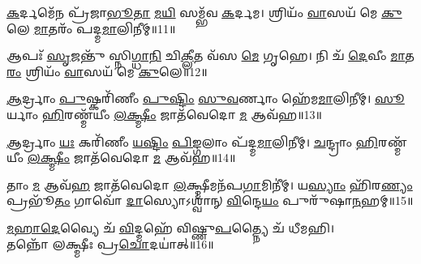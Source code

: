 \-\ul{𑌕}\-𑌰𑍍𑌦𑌮𑍇᳴𑌨 𑌪𑍍𑌰᳴𑌜𑌾\-\ul{𑌭𑍂}\-\-\ul{𑌤𑌾} \ul{𑌮}\-\-\ul{𑌯𑌿} 𑌸𑌮𑍍𑌭᳴𑌵 \ul{𑌕}\-𑌰𑍍𑌦𑌮।
𑌶𑍍𑌰𑌿𑌯𑌂᳴ \ul{𑌵𑌾}\-𑌸𑌯᳴ 𑌮𑍇 \ul{𑌕𑍁}\-𑌲𑍇 \ul{𑌮𑌾}\-𑌤𑌰𑌂᳴ 𑌪𑌦𑍍𑌮\-\ul{𑌮𑌾}\-𑌲𑌿𑌨𑍀𑌮𑍍॥11॥

𑌆𑌪𑌃᳴ \ul{𑌸𑍃}\-𑌜𑌨𑍍𑌤𑍁᳴ 𑌸𑍍𑌨𑌿\-\ul{𑌗𑍍𑌧𑌾}\-\-\ul{𑌨𑌿} 𑌚𑌿\-\ul{𑌕𑍍𑌲𑍀}\-𑌤 𑌵᳴𑌸 \ul{𑌮𑍇} 𑌗𑍃𑌹𑍇।
𑌨𑌿 𑌚᳴ \ul{𑌦𑍇}\-𑌵𑍀𑌂 \ul{𑌮𑌾}\-𑌤\-\ul{𑌰𑌂} 𑌶𑍍𑌰𑌿𑌯𑌂᳴ \ul{𑌵𑌾}\-𑌸𑌯᳴ 𑌮𑍇 \ul{𑌕𑍁}\-𑌲𑍇॥12॥

\-\ul{𑌆}\-𑌰𑍍𑌦𑍍𑌰𑌾𑌂 \ul{𑌪𑍁}\-𑌷𑍍𑌕𑌰𑌿᳴𑌣𑍀𑌂 \ul{𑌪𑍁}\-\-\ul{𑌷𑍍𑌟𑌿𑌂} \ul{𑌸𑍁}\-\-\ul{𑌵}\-𑌰𑍍𑌣𑌾𑌂 𑌹𑍇᳴𑌮\-\ul{𑌮𑌾}\-𑌲𑌿𑌨𑍀𑌮𑍍।
\-\ul{𑌸𑍂}\-𑌰𑍍𑌯𑌾𑌂 \ul{𑌹𑌿}\-𑌰𑌣𑍍𑌮᳴𑌯𑍀𑌂 \ul{𑌲}\-\-\ul{𑌕𑍍𑌷𑍍𑌮𑍀𑌂} 𑌜𑌾𑌤᳴𑌵𑍇𑌦𑍋 \ul{𑌮} 𑌆𑌵᳴𑌹॥13॥

\-\ul{𑌆}\-𑌰𑍍𑌦𑍍𑌰𑌾𑌂 \ul{𑌯𑌃} 𑌕𑌰𑌿᳴𑌣𑍀𑌂 \ul{𑌯}\-\-\ul{𑌷𑍍𑌟𑌿𑌂} \ul{𑌪𑌿}\-\-\ul{𑌙𑍍𑌗}\-𑌲𑌾𑌂 𑌪᳴𑌦𑍍𑌮\-\ul{𑌮𑌾}\-𑌲𑌿𑌨𑍀𑌮𑍍।
\-\ul{𑌚}\-𑌨𑍍𑌦𑍍𑌰𑌾𑌂 \ul{𑌹𑌿}\-𑌰𑌣𑍍𑌮᳴𑌯𑍀𑌂 \ul{𑌲}\-\-\ul{𑌕𑍍𑌷𑍍𑌮𑍀𑌂} 𑌜𑌾𑌤᳴𑌵𑍇𑌦𑍋 \ul{𑌮} 𑌆𑌵᳴𑌹॥14॥

𑌤𑌾𑌂 \ul{𑌮} 𑌆𑌵᳴\-\ul{𑌹} 𑌜𑌾𑌤᳴𑌵𑍇𑌦𑍋 \ul{𑌲}\-𑌕𑍍𑌷𑍍𑌮𑍀𑌮𑌨᳴𑌪\-\ul{𑌗𑌾}\-𑌮𑌿𑌨𑍀॑𑌮𑍍।
𑌯\-\ul{𑌸𑍍𑌯𑌾𑌂} 𑌹𑌿᳴𑌰\-\ul{𑌣𑍍𑌯𑌂} 𑌪𑍍𑌰𑌭𑍂᳴\-\ul{𑌤𑌂} 𑌗𑌾𑌵𑍋᳴ \ul{𑌦𑌾}\-𑌸𑍍𑌯𑍋𑌽𑌶𑍍𑌵𑌾॑𑌨𑍍 \ul{𑌵𑌿}\-𑌨𑍍𑌦𑍇\-\ul{𑌯𑌂} 𑌪𑍁𑌰𑍁᳴𑌷𑌾\-\ul{𑌨}\-𑌹𑌮𑍍॥15॥

\begin{center}
{\-\ul{𑌮}\-\-\ul{𑌹𑌾}\-\-\ul{𑌦𑍇}\-𑌵𑍍𑌯𑍈 𑌚᳴ \ul{𑌵𑌿}\-𑌦𑍍𑌮𑌹𑍇᳴ 𑌵𑌿𑌷𑍍𑌣𑍁\-\ul{𑌪}\-𑌤𑍍𑌨𑍍𑌯𑍈 𑌚᳴ 𑌧𑍀𑌮𑌹𑌿।\\
𑌤𑌨𑍍𑌨𑍋᳴ 𑌲𑌕𑍍𑌷𑍍𑌮𑍀𑌃 𑌪𑍍𑌰\-\ul{𑌚𑍋}\-𑌦𑌯𑌾॑𑌤𑍍॥16॥}
\end{center}

